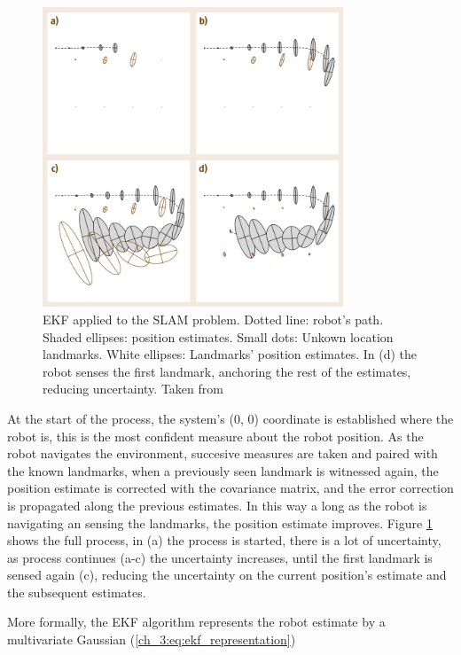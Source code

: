       \begin{figure}[!t]
        \centering
        \includegraphics[width=0.8\textwidth]{./Figures/slam_ekf_model.png}
        \caption{EKF applied to the SLAM problem. Dotted line: robot's path. Shaded ellipses: position estimates. Small dots: Unkown location landmarks. White ellipses: Landmarks' position estimates. In (d) the robot senses the first landmark, anchoring the rest of the estimates, reducing uncertainty. Taken from \cite{inbookhandbook}}
        \label{ch_3:fig:ekf_slam}
      \end{figure}

      At the start of the process, the system's ($0$, $0$) coordinate is established where the robot is, this is the most confident measure about the robot position. As the robot navigates the environment, succesive measures are taken and paired with the known landmarks, when a previously seen landmark is witnessed again, the position estimate is corrected with the covariance matrix, and the error correction is propagated along the previous estimates. In this way a long as the robot is navigating an sensing the landmarks, the position estimate improves. Figure \ref{ch_3:fig:ekf_slam} shows the full process, in (a) the process is started, there is a lot of uncertainty, as process continues (a-c) the uncertainty increases, until the first landmark is sensed again (c), reducing the uncertainty on the current position's estimate and the subsequent estimates.

      More formally, the EKF algorithm represents the robot estimate by a multivariate Gaussian (\ref{ch_3:eq:ekf_representation})
      
